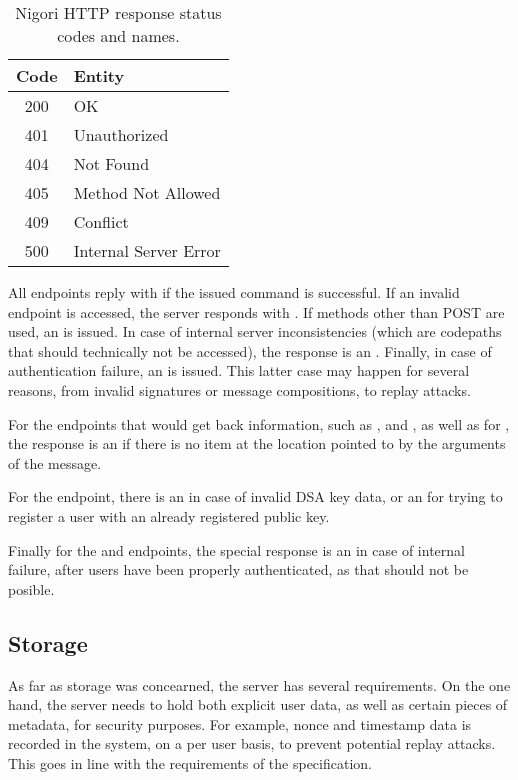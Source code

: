 \begin{table}[H]
  \centering
  \begin{tabular}{ | c | l | }
    \hline
    \textbf{Code} & \textbf{Entity} \\ \hline
  \hline
    200 & OK \\ \hline
    401 & Unauthorized \\ \hline
    404 & Not Found \\ \hline
    405 & Method Not Allowed \\ \hline
    409 & Conflict \\ \hline
    500 & Internal Server Error \\ \hline
  \end{tabular}
  \caption{Nigori HTTP response status codes and names.}
\end{table}

All endpoints reply with  if the issued command is successful.
If an invalid endpoint is accessed, the server responds with .
If methods other than POST are used, an  is issued.
In case of internal server inconsistencies (which are codepaths that should technically not be accessed), the response is an .
Finally, in case of authentication failure, an  is issued.
This latter case may happen for several reasons, from invalid signatures or message compositions, to replay attacks.

For the endpoints that would get back information, such as ,  and , as well as for , the response is an  if there is no item at the location pointed to by the arguments of the message.

For the  endpoint, there is an  in case of invalid DSA key data, or an  for trying to register a user with an already registered public key.

Finally for the  and  endpoints, the special response is an  in case of internal failure, after users have been properly authenticated, as that should not be posible.

\subsection{Storage}
As far as storage was concearned, the server has several requirements.
On the one hand, the server needs to hold both explicit user data, as well as certain pieces of metadata, for security purposes.
For example, nonce and timestamp data is recorded in the system, on a per user basis, to prevent potential replay attacks.
This goes in line with the requirements of the specification.

